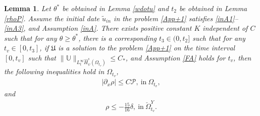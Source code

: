 \documentclass{amsart}
\numberwithin{equation}{section}
\newtheorem{lemma}{Lemma}[section]
\begin{document}
\begin{lemma}\label{rhoP'}
Let $\theta^{*}$ be obtained in Lemma \ref{wdotu} and $t_{2}$ be obtained in Lemma \ref{rhoP}.
Assume the initial date $\tilde{u}_{in}$ in the problem \eqref{App+1} satisfies \eqref{inA1}--\eqref{inA3}, and Assumption \ref{inA}.
There exists positive constant $K$ independent of $C$ such that for any $\theta\geq\theta^{*}$, there is a corresponding $t_{3}\in(0,t_{2}]$ such that for any $t_{v}\in[0,t_{3}]$, if $\mathfrak{U}$ is a solution to the problem \eqref{App+1} on the time interval $[0,t_{v}]$ such that
$\|\mathbb{U}\|_{L_{t}^{\infty}\hat{H}_{\psi}^{s}(\Omega_{t_{v}})}\leq C_{*}$,
and Assumption \ref{FA} holds for $t_{v}$, then the following inequalities hold in $\Omega_{t_{v}}$,
\begin{align}\label{rhox}
|\partial_{x}\rho|\leq C\mathcal{P},~\text{in}~\Omega_{t_{v}},
\end{align}
and
\begin{align}\label{rhol}
\rho\leq -\frac{15}{16}\delta,~\text{in}~\check{\Omega}_{t_{v}}^{Y}.
\end{align}

\end{lemma}
\end{document}
